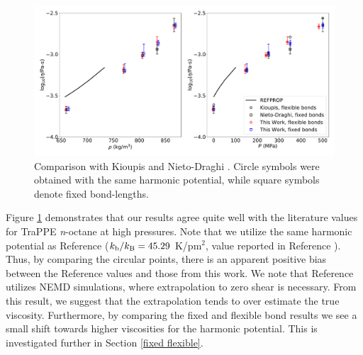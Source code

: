\documentclass[preprint,review,12pt]{elsarticle}
\begin{document}
    \begin{figure}[htb!]
		\centering
		\includegraphics[width=6.4in]{validation_TraPPE_octane.pdf}
		\caption{Comparison with Kioupis \cite{Kioupis2000} and Nieto-Draghi \cite{Nieto2006}. Circle symbols were obtained with the same harmonic potential, while square symbols denote fixed bond-lengths.}
		\label{fig:validation_runs2}
	\end{figure}

    Figure \ref{fig:validation_runs2} demonstrates that our results agree quite well with the literature values for TraPPE \textit{n}-octane at high pressures. Note that we utilize the same harmonic potential as Reference  ($k_{\rm b}/k_{\rm B} = 45.29$ K/pm$^2$, value reported in Reference ). Thus, by comparing the circular points, there is an apparent positive bias between the Reference  values and those from this work. We note that Reference  utilizes NEMD simulations, where extrapolation to zero shear is necessary. From this result, we suggest that the extrapolation tends to over estimate the true viscosity. Furthermore, by comparing the fixed and flexible bond results we see a small shift towards higher viscosities for the harmonic potential. This is investigated further in Section \ref{fixed flexible}.
    
    
\end{document}
